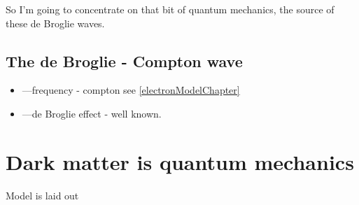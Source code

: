 \documentclass[../rzero]{subfiles}
\begin{document}
So I'm going to concentrate on that bit of quantum mechanics, the source of these de Broglie waves. 


\subsection{The de Broglie - Compton wave}
\begin{itemize}
  \item ---frequency - compton see \ref{electronModelChapter}
  \item ---de Broglie effect - well known.
 \end{itemize}







\section{Dark matter is quantum mechanics}
	Model is laid out 
\end{document}

